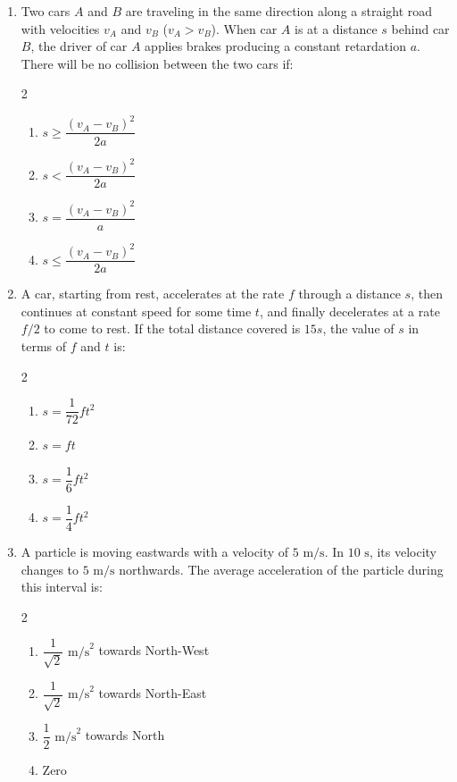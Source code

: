 \documentclass[11pt,a4paper]{article}
\begin{document}
\begin{enumerate}[label=\textbf{\textcolor{l2Amber}{Q\arabic*.}},leftmargin=24pt,itemsep=10pt,start=26]
  \item Two cars $A$ and $B$ are traveling in the same direction along a straight road with velocities $v_A$ and $v_B$ ($v_A > v_B$). When car $A$ is at a distance $s$ behind car $B$, the driver of car $A$ applies brakes producing a constant retardation $a$. There will be no collision between the two cars if:
  \begin{multicols}{2}
  \begin{enumerate}[label=\textbf{\textcolor{primaryDark}{(\Alph*)}},itemsep=2pt]
    \item $s \ge \dfrac{(v_A - v_B)^2}{2a}$
    \item $s < \dfrac{(v_A - v_B)^2}{2a}$
    \item $s = \dfrac{(v_A - v_B)^2}{a}$
    \item $s \le \dfrac{(v_A - v_B)^2}{2a}$
  \end{enumerate}
  \end{multicols}

  \item A car, starting from rest, accelerates at the rate $f$ through a distance $s$, then continues at constant speed for some time $t$, and finally decelerates at a rate $f/2$ to come to rest. If the total distance covered is $15s$, the value of $s$ in terms of $f$ and $t$ is:
  \begin{multicols}{2}
  \begin{enumerate}[label=\textbf{\textcolor{primaryDark}{(\Alph*)}},itemsep=2pt]
    \item $s = \dfrac{1}{72} f t^2$
    \item $s = f t$
    \item $s = \dfrac{1}{6} f t^2$
    \item $s = \dfrac{1}{4} f t^2$
  \end{enumerate}
  \end{multicols}

  \item A particle is moving eastwards with a velocity of $5\text{ m/s}$. In $10\text{ s}$, its velocity changes to $5\text{ m/s}$ northwards. The average acceleration of the particle during this interval is:
  \begin{multicols}{2}
  \begin{enumerate}[label=\textbf{\textcolor{primaryDark}{(\Alph*)}},itemsep=2pt]
    \item $\dfrac{1}{\sqrt{2}}\text{ m/s}^2$ towards North-West
    \item $\dfrac{1}{\sqrt{2}}\text{ m/s}^2$ towards North-East
    \item $\dfrac{1}{2}\text{ m/s}^2$ towards North
    \item Zero
  \end{enumerate}
  \end{multicols}


\end{enumerate}
\end{document}
